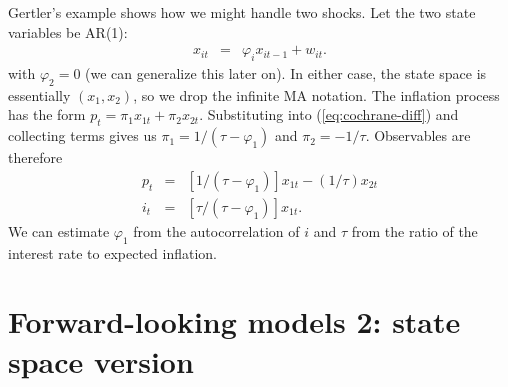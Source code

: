 \documentclass[11pt]{article}
\begin{document}
{\begin{itemize}
Gertler's example shows how we might handle two shocks.
Let the two state variables be AR(1):
\begin{eqnarray*}
    x_{it} &=& \varphi_i x_{it-1} + w_{it}  .
\end{eqnarray*}
with  $\varphi_2 = 0$
(we can generalize this later on).
In either case, the state space is essentially $ (x_1,x_2)$,
so we  drop the infinite MA notation.
The inflation process has the form
$ p_t = \pi_1 x_{1t} + \pi_2 x_{2t} $.
Substituting into (\ref{eq:cochrane-diff}) and collecting terms gives us
$ \pi_1 = 1/(\tau-\varphi_1) $ and $ \pi_2 = -1/\tau $.
Observables are therefore
\begin{eqnarray*}
    p_t  &=& [1/(\tau-\varphi_1)] x_{1t}- (1/\tau) x_{2t}  \\
        i_t &=& [\tau/(\tau-\varphi_1)] x_{1t} .
\end{eqnarray*}
We can estimate $\varphi_1$ from the autocorrelation of $i$
and $\tau$ from the ratio of the interest rate to expected inflation.



\section{Forward-looking models 2:  state space version}


\end{itemize}}
\end{document}
